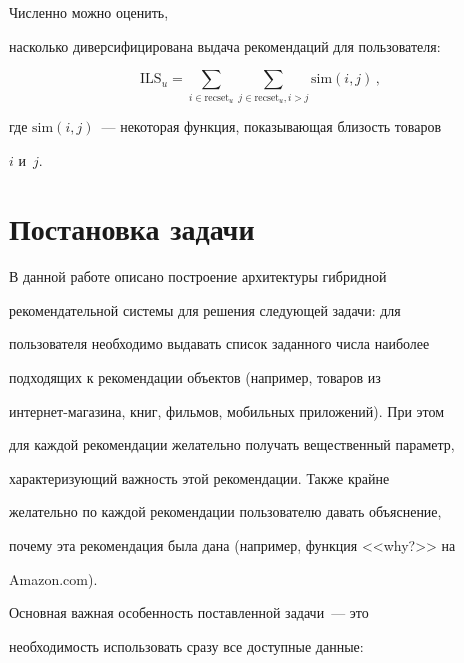 Численно можно оценить,


насколько диверсифицирована выдача рекомендаций для пользователя:


$$


\mathrm{ILS}_u=\sum\limits_{i \in \mathrm{recset}_u} \sum\limits_{j \in 


\mathrm{recset}_u, i>j} \mathrm{sim}\left(i,j\right)\,,


$$


где $\mathrm{sim}\left(i,j\right)$~--- некоторая функция, показывающая близость товаров


$i$ и~$j.$





\section{Постановка задачи}





В данной работе описано построение архитектуры гибридной


рекомендательной системы для решения следующей задачи: для


пользователя необходимо выдавать список заданного числа наиболее


подходящих к рекомендации объектов (например, товаров из


ин\-тер\-нет-ма\-га\-зи\-на, книг, фильмов, мобильных приложений). При этом


для каждой рекомендации желательно получать вещественный параметр,


характеризующий важность этой рекомендации. Также крайне


желательно по каждой рекомендации пользователю давать объяснение,


почему эта рекомендация была дана (например, функция <<why?>> на


{\sf Amazon.com}).





Основная важная особенность поставленной задачи~--- это


необходимость использовать сразу все доступные данные:


